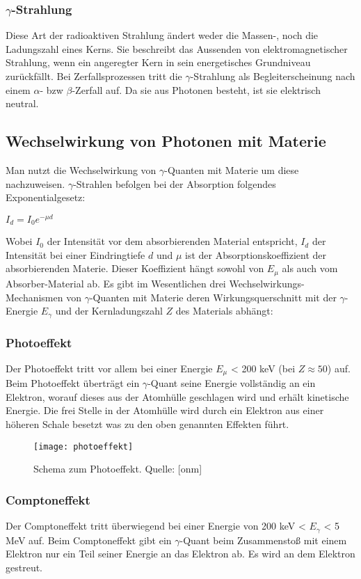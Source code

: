 \subsubsection{$\gamma$-Strahlung}
Diese Art der radioaktiven Strahlung ändert weder die Massen-, noch die Ladungszahl eines Kerns. Sie beschreibt das Aussenden von elektromagnetischer Strahlung, wenn ein angeregter Kern in sein energetisches Grundniveau zurückfällt. Bei Zerfallsprozessen tritt die $\gamma$-Strahlung als Begleiterscheinung nach einem $\alpha$- bzw $\beta$-Zerfall auf. Da sie aus Photonen besteht, ist sie elektrisch neutral.
\subsection{Wechselwirkung von Photonen mit Materie}
Man nutzt die Wechselwirkung von $\gamma$-Quanten mit Materie um diese nachzuweisen. $\gamma$-Strahlen befolgen bei der Absorption folgendes Exponentialgesetz:
\begin{center}
$I_d=I_0e^{-\mu d}$
\end{center}
Wobei $I_0$ der Intensität vor dem absorbierenden Material entspricht, $I_d$ der Intensität bei einer Eindringtiefe $d$ und $\mu$ ist der Absorptionskoeffizient der absorbierenden Materie. Dieser Koeffizient hängt sowohl von $E_{\mu}$ als auch vom Absorber-Material ab.
Es gibt im Wesentlichen drei Wechselwirkungs-Mechanismen von $\gamma$-Quanten mit Materie deren Wirkungsquerschnitt mit der $\gamma$-Energie $E_{\gamma}$ und der Kernladungszahl $Z$ des Materials abhängt:
\subsubsection{Photoeffekt}
Der Photoeffekt tritt vor allem bei einer Energie $E_{\mu}$ < 200 keV (bei $Z \approx 50$) auf. Beim Photoeffekt überträgt ein $\gamma$-Quant seine Energie vollständig an ein Elektron, worauf dieses aus der Atomhülle geschlagen wird und erhält kinetische Energie. Die frei Stelle in der Atomhülle wird durch ein Elektron aus einer höheren Schale besetzt was zu den oben genannten Effekten führt.
\begin{figure}[h]
\begin{center}
\texttt{[image: photoeffekt]}
\caption{Schema zum Photoeffekt. Quelle: [onm]}
\label{fig:photo}
\end{center}
\end{figure}
\subsubsection{Comptoneffekt}
Der Comptoneffekt tritt überwiegend bei einer Energie von 200 keV < $E_{\gamma}$ < 5 MeV auf. Beim Comptoneffekt gibt ein $\gamma$-Quant beim Zusammenstoß mit einem Elektron nur ein Teil seiner Energie an das Elektron ab. Es wird an dem Elektron gestreut.

